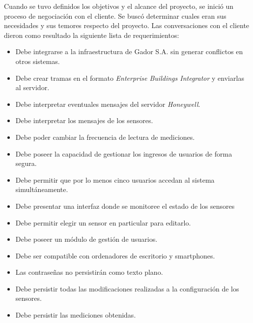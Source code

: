 Cuando se tuvo definidos los objetivos y el alcance del proyecto, se inició un proceso de negociación con el cliente.
Se buscó determinar cuales eran sus necesidades y sus temores respecto del proyecto.
Las conversaciones con el cliente dieron como resultado la siguiente lista de requerimientos:

\newpage

\begin{itemize}
	\item Debe integrarse a la infraestructura de Gador S.A. sin generar conflictos en otros sistemas.
	\item Debe crear tramas en el formato \emph{Enterprise Buildings Integrator} y enviarlas al servidor.
	\item Debe interpretar eventuales mensajes del servidor \emph{Honeywell}.
	\item Debe interpretar los mensajes de los sensores.
	\item Debe poder cambiar la frecuencia de lectura de mediciones.
	\item Debe poseer la capacidad de gestionar los ingresos de usuarios de forma segura.
	\item Debe permitir que por lo menos cinco usuarios accedan al sistema simultáneamente.
	\item Debe presentar una interfaz donde se monitoree el estado de los sensores
	\item Debe permitir elegir un sensor en particular para editarlo.
	\item Debe poseer un módulo de gestión de usuarios.
	\item Debe ser compatible con ordenadores de escritorio y smartphones.
	\item Las contraseñas no persistirán como texto plano.
	\item Debe persistir todas las modificaciones realizadas a la configuración de los sensores.
	\item Debe persistir las mediciones obtenidas.
\end{itemize}